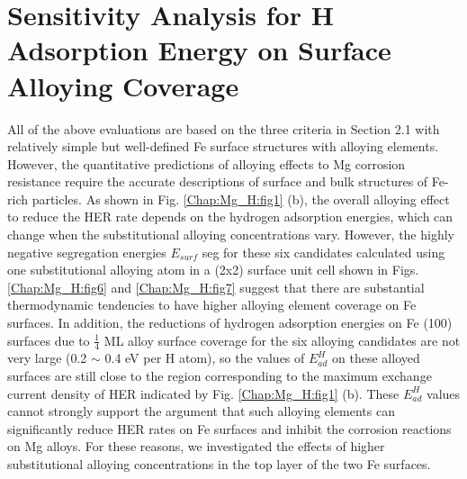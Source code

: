 \section{Sensitivity Analysis for H Adsorption Energy on Surface Alloying Coverage}

All of the above evaluations are based on the three criteria in Section 2.1 with relatively simple but well-defined Fe surface structures with alloying elements. However, the quantitative predictions of alloying effects to Mg corrosion resistance require the accurate descriptions of surface and bulk structures of Fe-rich particles. As shown in Fig. \ref{Chap:Mg_H:fig1} (b), the overall alloying effect to reduce the \ac{HER} rate depends on the hydrogen adsorption energies, which can change when the substitutional alloying concentrations vary. However, the highly negative segregation energies $E_{surf}$ seg for these six candidates calculated using one substitutional alloying atom in a (2x2) surface unit cell shown in Figs. \ref{Chap:Mg_H:fig6} and \ref{Chap:Mg_H:fig7} suggest that there are substantial thermodynamic tendencies to have higher alloying element coverage on Fe surfaces. In addition, the reductions of hydrogen adsorption energies on Fe (100) surfaces due to $\frac{1}{4}$ \ac{ML} alloy surface coverage for the six alloying candidates are not very large (0.2 $\sim$ 0.4 eV per H atom), so the values of $E_{ad}^H$  on these alloyed surfaces are still close to the region corresponding to the maximum exchange current density of HER indicated by Fig. \ref{Chap:Mg_H:fig1} (b). These $E_{ad}^H$ values cannot strongly support the argument that such alloying elements can significantly reduce HER rates on Fe surfaces and inhibit the corrosion reactions on Mg alloys. For these reasons, we investigated the effects of higher substitutional alloying concentrations in the top layer of the two Fe surfaces.


